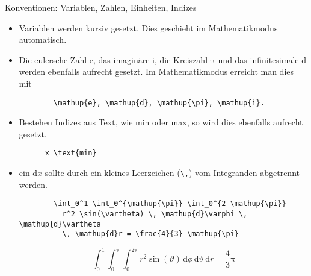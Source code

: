 \begin{frame}[fragile]{Konventionen: Variablen, Zahlen, Einheiten, Indizes}
  \begin{itemize}
    \item Variablen werden kursiv gesetzt.
      Dies geschieht im Mathematikmodus automatisch.
    \item Die eulersche Zahl $\mathup{e}$, das imaginäre $\mathup{i}$, die Kreiszahl $\mathup{\pi}$ und das infinitesimale $\mathup{d}$ werden ebenfalls aufrecht gesetzt.
      Im Mathematikmodus erreicht man dies mit
      \begin{lstlisting}
        \mathup{e}, \mathup{d}, \mathup{\pi}, \mathup{i}.
      \end{lstlisting}
    \item Bestehen Indizes aus Text, wie min oder max, so wird dies ebenfalls aufrecht gesetzt.
      \begin{lstlisting}
      x_\text{min}
      \end{lstlisting}
    \item ein $\mathrm{d}x$ sollte durch ein kleines Leerzeichen (\verb+\,+) vom Integranden abgetrennt werden.

      \vspace{5pt}
      \begin{lstlisting}
        \int_0^1 \int_0^{\mathup{\pi}} \int_0^{2 \mathup{\pi}}
          r^2 \sin(\vartheta) \, \mathup{d}\varphi \, \mathup{d}\vartheta
          \, \mathup{d}r = \frac{4}{3} \mathup{\pi}
      \end{lstlisting}

      \begin{equation*}
        \int_0^1 \int_0^{\mathup{\pi}} \int_0^{2 \mathup{\pi}} r^2 \sin(\vartheta) \, \mathup{d}\phi \, \mathup{d}\vartheta \, \mathup{d}r = \frac{4}{3} \mathup{\pi}
      \end{equation*}
  \end{itemize}
\end{frame}
